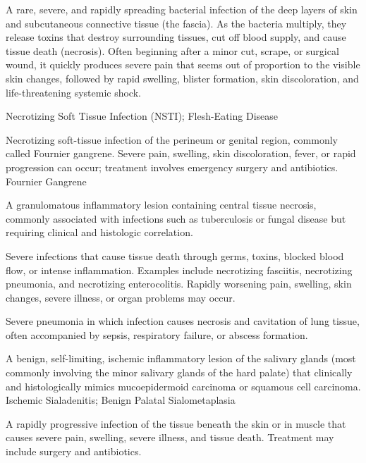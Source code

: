  A rare, severe, and rapidly spreading bacterial infection of the deep layers of skin and subcutaneous connective tissue (the fascia). As the bacteria multiply, they release toxins that destroy surrounding tissues, cut off blood supply, and cause tissue death (necrosis). Often beginning after a minor cut, scrape, or surgical wound, it quickly produces severe pain that seems out of proportion to the visible skin changes, followed by rapid swelling, blister formation, skin discoloration, and life-threatening systemic shock.

\synonyms
Necrotizing Soft Tissue Infection (NSTI); Flesh-Eating Disease

 Necrotizing soft-tissue infection of the perineum or genital region, commonly called Fournier gangrene. Severe pain, swelling, skin discoloration, fever, or rapid progression can occur; treatment involves emergency surgery and antibiotics.
\synonyms
Fournier Gangrene

 A granulomatous inflammatory lesion containing central tissue necrosis, commonly associated with infections such as tuberculosis or fungal disease but requiring clinical and histologic correlation.

 Severe infections that cause tissue death through germs, toxins, blocked blood flow, or intense inflammation. Examples include necrotizing fasciitis, necrotizing pneumonia, and necrotizing enterocolitis. Rapidly worsening pain, swelling, skin changes, severe illness, or organ problems may occur.

 Severe pneumonia in which infection causes necrosis and cavitation of lung tissue, often accompanied by sepsis, respiratory failure, or abscess formation.

 A benign, self-limiting, ischemic inflammatory lesion of the salivary glands (most commonly involving the minor salivary glands of the hard palate) that clinically and histologically mimics mucoepidermoid carcinoma or squamous cell carcinoma.
\synonyms
Ischemic Sialadenitis; Benign Palatal Sialometaplasia

 A rapidly progressive infection of the tissue beneath the skin or in muscle that causes severe pain, swelling, severe illness, and tissue death. Treatment may include surgery and antibiotics.

